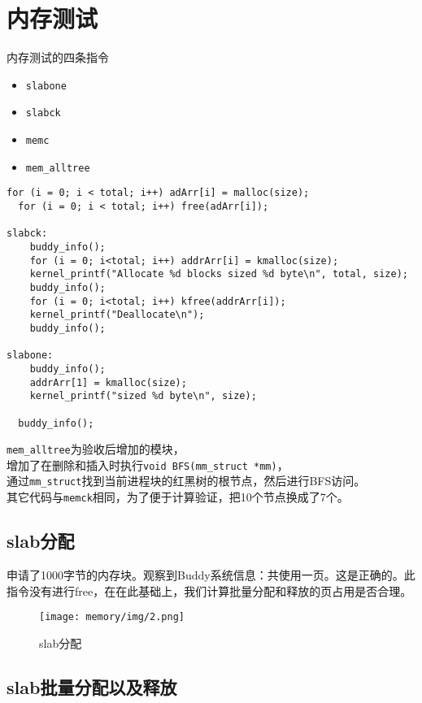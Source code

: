 \section{内存测试}

内存测试的四条指令

\begin{itemize}
\item \texttt{slabone}
\item \texttt{slabck}
\item \texttt{memc}
\item \texttt{mem\_alltree}
\end{itemize}

\begin{lstlisting}[caption=memc]
  for (i = 0; i < total; i++) adArr[i] = malloc(size);
  for (i = 0; i < total; i++) free(adArr[i]);

slabck:
	buddy_info();
	for (i = 0; i<total; i++) addrArr[i] = kmalloc(size);
	kernel_printf("Allocate %d blocks sized %d byte\n", total, size);
	buddy_info();
	for (i = 0; i<total; i++) kfree(addrArr[i]);
	kernel_printf("Deallocate\n");
	buddy_info();

slabone:
	buddy_info();
	addrArr[1] = kmalloc(size);
	kernel_printf("sized %d byte\n", size);

  buddy_info();
\end{lstlisting}

\texttt{mem\_alltree}为验收后增加的模块，\\
增加了在删除和插入时执行\texttt{void BFS(mm\_struct *mm)}，\\
通过\texttt{mm\_struct}找到当前进程块的红黑树的根节点，然后进行BFS访问。\\
其它代码与\texttt{memck}相同，为了便于计算验证，把10个节点换成了7个。

\subsection{slab分配}
 
申请了1000字节的内存块。观察到Buddy系统信息：共使用一页。这是正确的。此指令没有进行free，在在此基础上，我们计算批量分配和释放的页占用是否合理。

\begin{figure}[H]
  \centering
  \texttt{[image: memory/img/2.png]}
  \caption{slab分配}
\end{figure}

\subsection{slab批量分配以及释放}

